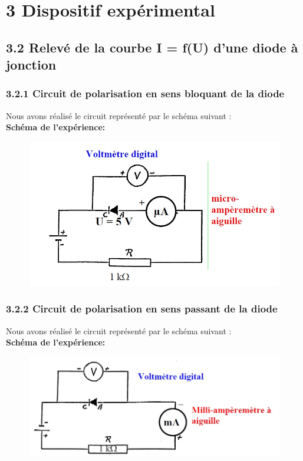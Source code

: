 \documentclass{report}
\begin{document}
\newpage

\section*{3 Dispositif exp\'erimental}

\subsection*{3.2 Relevé de la courbe I = f(U) d'une diode à jonction}

\subsubsection*{3.2.1 Circuit de polarisation en sens bloquant de la diode}
Nous avons r\'ealis\'e le circuit repr\'esent\'e par le sch\'ema suivant :\\

\textbf{Sch\'ema de l'exp\'erience: }
\begin{figure}[h!]
\centering
\includegraphics[scale=0.5]{ScheBlo.jpg}
\end{figure}

\newpage
\subsubsection*{3.2.2 Circuit de polarisation en sens passant de la diode}

Nous avons réalisé le circuit représenté par le schéma suivant :\\

\textbf{Schéma de l'expérience: }
\begin{figure}[h!]
\centering
\includegraphics[scale=0.5]{SchePas.jpg}
\end{figure}
\newpage
\end{document}
